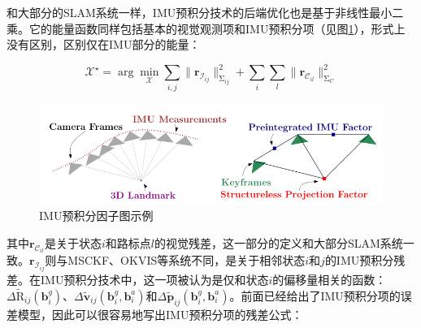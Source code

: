 和大部分的SLAM系统一样，IMU预积分技术的后端优化也是基于非线性最小二乘。它的能量函数同样包括基本的视觉观测项和IMU预积分项（见图\ref{fig:preint}），形式上没有区别，区别仅在IMU部分的能量：

\begin{equation}\label{eq:gtsam_res}
    \bm{\mathcal X}^\star =
        \arg\mathop{\min}_{\bm{\mathcal X}}
        \sum_{i,j}\lVert \mathbf{r}_{\mathcal{I}_{ij}} \rVert^2_{\mathrm\Sigma_{ij}} +
        \sum_{i} \sum_{l} \lVert \mathbf{r}_{\mathcal{C}_{il}} \rVert^2_{\mathrm\Sigma_{C}}
\end{equation}

\begin{figure}[htb!]
    \centering
    \includegraphics[width=.8\textwidth]{./figs/preint.png}
    \caption{IMU预积分因子图示例\citep{forster2017manifold}}
    \label{fig:preint}
\end{figure}

其中$\mathbf{r}_{\mathcal{C}_{il}}$是关于状态$i$和路标点$l$的视觉残差，这一部分的定义和大部分SLAM系统一致。$\mathbf{r}_{\mathcal{I}_{ij}}$则与MSCKF、OKVIS等系统不同，是关于相邻状态$i$和$j$的IMU预积分残差。在IMU预积分技术中，这一项被认为是仅和状态$i$的偏移量相关的函数：$\Delta\tilde{\mathrm R}_{ij}(\mathbf{b}^g_i)$、$\Delta\tilde{\mathbf v}_{ij}(\mathbf{b}^g_i, \mathbf{b}^a_i)$和$\Delta\tilde{\mathbf p}_{ij}(\mathbf{b}^g_i, \mathbf{b}^a_i)$。前面已经给出了IMU预积分项的误差模型，因此可以很容易地写出IMU预积分项的残差公式：

